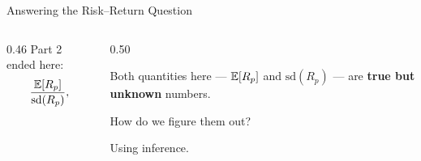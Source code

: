 \documentclass[9pt,english,aspectratio=169]{beamer}
\begin{document}



\begin{frame}{Answering the Risk--Return Question}


  \begin{columns}
    \begin{column}{0.46\textwidth}
      Part 2 ended here:
      \[
        \frac{\mathbb{E}[R_p]}{\text{sd}(R_p)},
      \]
      \vspace{-1.1em}      \pause
    \end{column}
    \begin{column}{0.50\textwidth}
        \vspace{0.6em}
        \begin{insightbox}
          Both quantities here --- $\mathbb{E}[R_p]$ and $\text{sd}(R_p)$ --- are \textbf{true but unknown} numbers. 
        \end{insightbox}
      \pause
        \begin{questionbox}
          How do we figure them out? 
        \end{questionbox}
        \pause
        \begin{answerbox}
          Using inference. 
        \end{answerbox}
    \end{column}
  \end{columns}

\end{frame}
\end{document}
